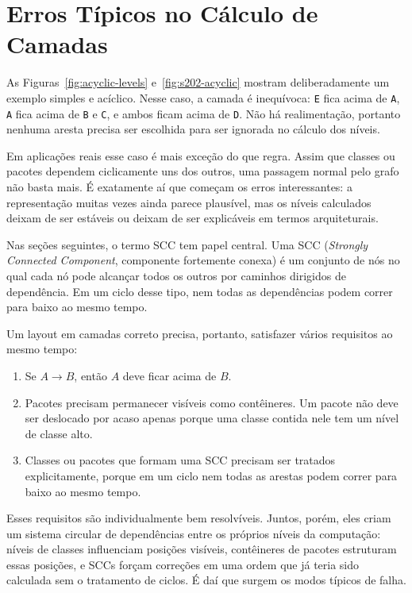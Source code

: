 \documentclass[a4paper,11pt]{article}
\begin{document}
\section{Erros T\'ipicos no C\'alculo de Camadas}

As Figuras~\ref{fig:acyclic-levels} e~\ref{fig:s202-acyclic} mostram
deliberadamente um exemplo simples e ac\'iclico. Nesse caso, a camada \'e
inequ\'ivoca: \texttt{E} fica acima de \texttt{A}, \texttt{A} fica acima de
\texttt{B} e \texttt{C}, e ambos ficam acima de \texttt{D}. N\~ao h\'a
realimenta\c{c}\~ao, portanto nenhuma aresta precisa ser escolhida para ser
ignorada no c\'alculo dos n\'iveis.

Em aplica\c{c}\~oes reais esse caso \'e mais exce\c{c}\~ao do que regra. Assim
que classes ou pacotes dependem ciclicamente uns dos outros, uma passagem
normal pelo grafo n\~ao basta mais. \'E exatamente a\'i que come\c{c}am os
erros interessantes: a representa\c{c}\~ao muitas vezes ainda parece
plaus\'ivel, mas os n\'iveis calculados deixam de ser est\'aveis ou deixam de
ser explic\'aveis em termos arquiteturais.

Nas se\c{c}\~oes seguintes, o termo SCC tem papel central. Uma SCC
(\emph{Strongly Connected Component}, componente fortemente conexa) \'e um
conjunto de n\'os no qual cada n\'o pode alcan\c{c}ar todos os outros por
caminhos dirigidos de depend\^encia. Em um ciclo desse tipo, nem todas as
depend\^encias podem correr para baixo ao mesmo tempo.

Um layout em camadas correto precisa, portanto, satisfazer v\'arios requisitos
ao mesmo tempo:

\begin{enumerate}
  \item Se $A \to B$, ent\~ao $A$ deve ficar acima de $B$.
  \item Pacotes precisam permanecer vis\'iveis como cont\^eineres. Um pacote
        n\~ao deve ser deslocado por acaso apenas porque uma classe contida
        nele tem um n\'ivel de classe alto.
  \item Classes ou pacotes que formam uma SCC precisam ser tratados
        explicitamente, porque em um ciclo nem todas as arestas podem correr
        para baixo ao mesmo tempo.
\end{enumerate}

Esses requisitos s\~ao individualmente bem resolv\'iveis. Juntos, por\'em,
eles criam um sistema circular de depend\^encias entre os pr\'oprios n\'iveis
da computa\c{c}\~ao: n\'iveis de classes influenciam posi\c{c}\~oes
vis\'iveis, cont\^eineres de pacotes estruturam essas posi\c{c}\~oes, e SCCs
for\c{c}am corre\c{c}\~oes em uma ordem que j\'a teria sido calculada sem o
tratamento de ciclos. \'E da\'i que surgem os modos t\'ipicos de falha.
\end{document}
